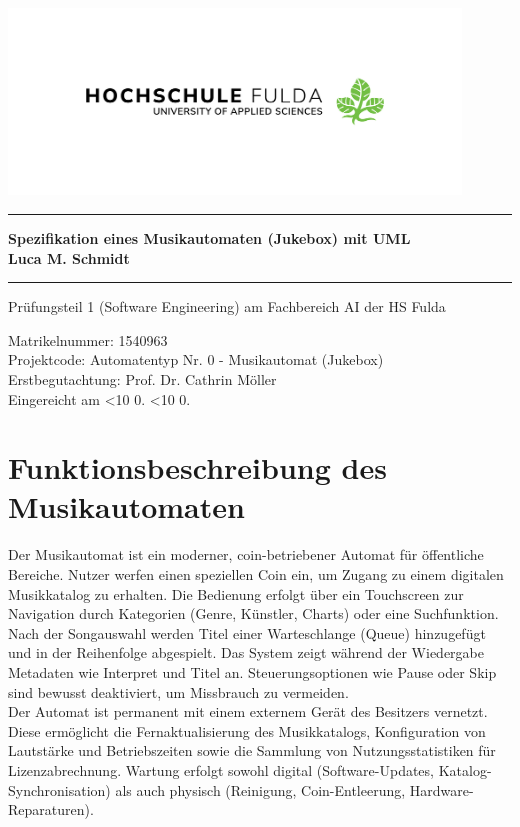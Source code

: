 \documentclass[12pt,oneside]{article}
\newcommand{\todayddmmyyyy}{%
  \ifnum\day<10 0\fi\the\day.%
  \ifnum\month<10 0\fi\the\month.%
  \the\year}
\newcommand{\HSFTitle}[8]{

  \thispagestyle{empty}
\begin{center}
    \includegraphics[width=0.9\textwidth]{logo_new_2.png} \\
    \vspace*{\stretch{1}}
    \end{center}

  {\parindent0cm
  \rule{\linewidth}{.7ex}}
  \begin{center}
    \vspace*{\stretch{1}}
    \sffamily\bfseries\Huge
    #1\\
    \vspace*{\stretch{1}}
    \sffamily\bfseries\large
    #3
    \vspace*{\stretch{1}}
  \end{center}
  \rule{\linewidth}{.7ex}

  \vspace*{\stretch{2}}
  \begin{center}
    \Large #2 am #5 der HS Fulda \\
    \vspace*{\stretch{1}}

    \large Matrikelnummer:  #4 \\[1mm]
    \large Projektcode: Automatentyp Nr. 0 - Musikautomat (Jukebox) \\[1mm]
    \large Erstbegutachtung:  #7 \\[1mm]

    \vspace*{\stretch{1}}
    \large Eingereicht am #6
  \end{center}
}
\begin{document}
  \HSFTitle
      {Spezifikation eines Musikautomaten (Jukebox) mit UML}       %
      {Prüfungsteil 1 (Software Engineering)} %
      {Luca M. Schmidt}          %
      {1540963}
      {Fachbereich AI}  %
      {\todayddmmyyyy}        %
      {Prof. Dr. Cathrin Möller}     %

  \clearpage

\lhead{}
    \setcounter{page}{1}

\tableofcontents
\listoffigures
\clearpage


\cleardoublepage
{}
    \setcounter{page}{1}
\lhead{\nouppercase{\leftmark}}


\section{Funktionsbeschreibung des Musikautomaten} \label{sec:funktionsbeschreibung}
Der Musikautomat ist ein moderner, coin-betriebener Automat für öffentliche Bereiche. Nutzer werfen einen speziellen Coin ein, um Zugang zu einem digitalen Musikkatalog zu erhalten. Die Bedienung erfolgt über ein Touchscreen zur Navigation durch Kategorien (Genre, Künstler, Charts) oder eine Suchfunktion.\\
Nach der Songauswahl werden Titel einer Warteschlange (Queue) hinzugefügt und in der Reihenfolge abgespielt. Das System zeigt während der Wiedergabe Metadaten wie Interpret und Titel an. Steuerungsoptionen wie Pause oder Skip sind bewusst deaktiviert, um Missbrauch zu vermeiden.\\
Der Automat ist permanent mit einem externem Gerät des Besitzers vernetzt. Diese ermöglicht die Fernaktualisierung des Musikkatalogs, Konfiguration von Lautstärke und Betriebszeiten sowie die Sammlung von Nutzungsstatistiken für Lizenzabrechnung. Wartung erfolgt sowohl digital (Software-Updates, Katalog-Synchronisation) als auch physisch (Reinigung, Coin-Entleerung, Hardware-Reparaturen).
\end{document}
